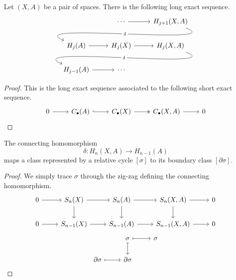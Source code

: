 \documentclass[main.tex]{subfiles}
\begin{document}
\begin{proposition}
  \label{prop:les_on_a_pair_of_spaces}
  Let $(X, A)$ be a pair of spaces. There is the following long exact sequence.
  \begin{equation*}
    \begin{tikzcd}
      & \cdots
      \arrow[r]
      & H_{j+1}(X, A)
      \\
      H_{j}(A)
      \arrow[from=urr, out=-22, in=157, looseness=1, overlay, "\delta" description]
      \arrow[r,]
      & H_{j}(X)
      \arrow[r,]
      & H_{j}(X, A)
      \\
      H_{j-1}(A)
      \arrow[r]
      \arrow[from=urr, out=-22, in=157, looseness=1, overlay, "\delta" description]
      & \cdots
    \end{tikzcd}
  \end{equation*}
\end{proposition}
\begin{proof}
  This is the long exact sequence associated to the following short exact sequence.
  \begin{equation*}
    \begin{tikzcd}
      0
      \arrow[r]
      & C_{\bullet}(A)
      \arrow[r, hook]
      & C_{\bullet}(X)
      \arrow[r, two heads]
      & C_{\bullet}(X, A)
      \arrow[r]
      & 0
    \end{tikzcd}
  \end{equation*}
\end{proof}

\begin{proposition}
  The connecting homomorphism
  \begin{equation*}
    \delta\colon H_{n}(X, A) \to H_{n-1}(A)
  \end{equation*}
  maps a class represented by a relative cycle \([\sigma]\) to its boundary class \([\partial \sigma]\).
\end{proposition}
\begin{proof}
  We simply trace \(\sigma\) through the zig-zag defining the connecting homomorphism.
  \begin{equation*}
    \begin{tikzcd}
      0
      \arrow[r]
      & S_{n}(X)
      \arrow[r]
      \arrow[d]
      & S_{n}(A)
      \arrow[r]
      \arrow[d]
      & S_{n}(X, A)
      \arrow[r]
      \arrow[d]
      & 0
      \\
      0
      \arrow[r]
      & S_{n-1}(X)
      \arrow[r]
      & S_{n-1}(A)
      \arrow[r]
      & S_{n-1}(X, A)
      \arrow[r]
      & 0
    \end{tikzcd}
  \end{equation*}
  \begin{equation*}
    \begin{tikzcd}
      & \sigma
      \arrow[r, mapsto]
      \arrow[d, mapsto]
      & \sigma
      \\
      \partial \sigma
      \arrow[r, mapsto]
      & \partial \sigma
    \end{tikzcd}
  \end{equation*}
\end{proof}
\end{document}
